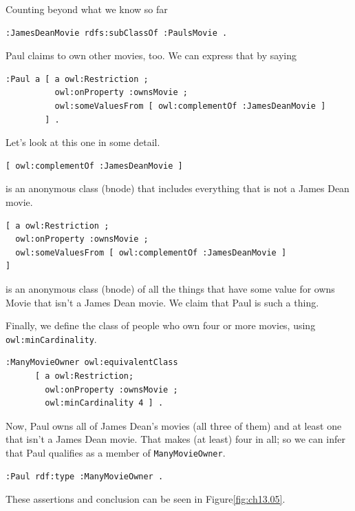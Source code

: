 \begin{challenge}{Counting beyond what we know so far}
\begin{lstlisting}
:JamesDeanMovie rdfs:subClassOf :PaulsMovie .
\end{lstlisting}

Paul claims to own other movies, too. We can express that by saying

\begin{lstlisting}
:Paul a [ a owl:Restriction ;
          owl:onProperty :ownsMovie ;
          owl:someValuesFrom [ owl:complementOf :JamesDeanMovie ] 
        ] .
\end{lstlisting}

Let's look at this one in some detail.

\begin{lstlisting}
[ owl:complementOf :JamesDeanMovie ]
\end{lstlisting}

is an anonymous class (bnode) that includes everything that is not a
James Dean movie.

\begin{lstlisting}
[ a owl:Restriction ;
  owl:onProperty :ownsMovie ;
  owl:someValuesFrom [ owl:complementOf :JamesDeanMovie ]
]
\end{lstlisting}

is an anonymous class (bnode) of all the things that have some value for
owns Movie that isn't a James Dean movie. We claim that Paul is such a
thing.

Finally, we define the class of people who own four or more movies,
using \texttt{owl:minCardinality}.

\begin{lstlisting}
:ManyMovieOwner owl:equivalentClass
      [ a owl:Restriction;
        owl:onProperty :ownsMovie ;
        owl:minCardinality 4 ] .
\end{lstlisting}

Now, Paul owns all of James Dean's movies (all three of them) and at
least one that isn't a James Dean movie. That makes (at least) four in
all; so we can infer that Paul qualifies as a member of \texttt{ManyMovieOwner}.

\begin{lstlisting}
:Paul rdf:type :ManyMovieOwner .
\end{lstlisting}

These assertions and conclusion can be seen in Figure\ref{fig:ch13.05}.


\end{challenge}
